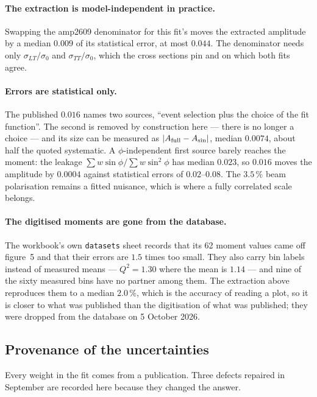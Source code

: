 \documentclass[11pt,a4paper]{article}
\newcommand{\sig}[1]{\sigma_{#1}}
\begin{document}
\paragraph{The extraction is model-independent in practice.}  Swapping the
amp2609 denominator for this fit's moves the extracted amplitude by a median
$0.009$ of its statistical error, at most $0.044$.  The denominator needs only
$\sig{LT}/\sigma_0$ and $\sig{TT}/\sigma_0$, which the cross sections pin and on
which both fits agree.

\paragraph{Errors are statistical only.}  The published $0.016$ names two
sources, ``event selection plus the choice of the fit function''.  The second is
removed by construction here --- there is no longer a choice --- and its size
can be measured as $|A_{\rm full} - A_{\sin}|$, median $0.0074$, about half the
quoted systematic.  A $\phi$-independent first source barely reaches the moment:
the leakage $\sum w\sin\phi / \sum w \sin^2\phi$ has median $0.023$, so $0.016$
moves the amplitude by $0.0004$ against statistical errors of $0.02$--$0.08$.
The $3.5\,\%$ beam polarisation remains a fitted nuisance, which is where a
fully correlated scale belongs.

\paragraph{The digitised moments are gone from the database.}  The workbook's
own \texttt{datasets} sheet records that its 62 moment values came off figure~5
and that their errors are $1.5$ times too small.  They also carry bin labels
instead of measured means --- $Q^2 = 1.30$ where the mean is $1.14$ --- and nine
of the sixty measured bins have no partner among them.  The extraction above
reproduces them to a median $2.0\,\%$, which is the accuracy of reading a plot,
so it is closer to what was published than the digitisation of what was
published; they were dropped from the database on 5 October 2026.

\subsection{Provenance of the uncertainties}

Every weight in the fit comes from a publication.  Three defects repaired in
September are recorded here because they changed the answer.
\end{document}
